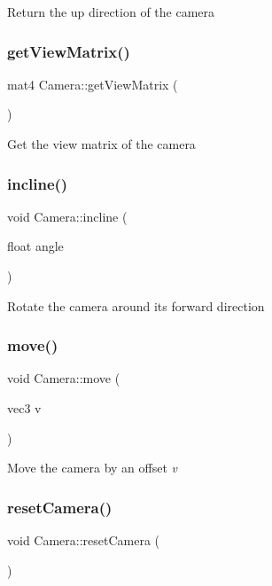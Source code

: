 Return the up direction of the camera \mbox{\label{classCamera_a26c21a39c99b37158c16b0b16a3b0a56}} 
\subsubsection{\texorpdfstring{get\+View\+Matrix()}{getViewMatrix()}}
{\footnotesize\ttfamily mat4 Camera\+::get\+View\+Matrix (\begin{DoxyParamCaption}{ }\end{DoxyParamCaption})}

Get the view matrix of the camera \mbox{\label{classCamera_add348dd18fb069dfad8ff7c941adf2d4}} 
\subsubsection{\texorpdfstring{incline()}{incline()}}
{\footnotesize\ttfamily void Camera\+::incline (\begin{DoxyParamCaption}\item[{float}]{angle }\end{DoxyParamCaption})}

Rotate the camera around it\textquotesingle{}s forward direction \mbox{\label{classCamera_a35d93a9130ec85a19d76154ee8fc8b2b}} 
\subsubsection{\texorpdfstring{move()}{move()}}
{\footnotesize\ttfamily void Camera\+::move (\begin{DoxyParamCaption}\item[{vec3}]{v }\end{DoxyParamCaption})}

Move the camera by an offset {\itshape v} {\itshape } \mbox{\label{classCamera_aee8027b5309a5dc77db956d27924c387}} 
\subsubsection{\texorpdfstring{reset\+Camera()}{resetCamera()}}
{\footnotesize\ttfamily void Camera\+::reset\+Camera (\begin{DoxyParamCaption}{ }\end{DoxyParamCaption})}

